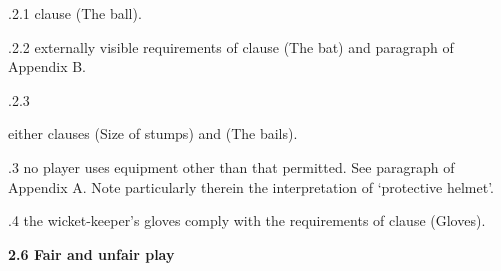 \documentclass[12pt]{article}
\begin{document}
\vspace{\baselineskip}
\begin{adjustwidth}{0.49in}{0.0in}
{\fontsize{9pt}{10.8pt}.2.1 \tabto{1.17in} clause (The ball).\par}\par

\end{adjustwidth}


\vspace{\baselineskip}
\begin{adjustwidth}{0.49in}{0.0in}
{\fontsize{9pt}{10.8pt}.2.2 \tabto{1.17in} externally visible requirements of clause (The bat) and paragraph of Appendix B.\par}\par

\end{adjustwidth}


\vspace{\baselineskip}
\begin{adjustwidth}{0.49in}{0.0in}
{\fontsize{9pt}{10.8pt}.2.3 \tabto{1.17in} {\fontsize{8pt}{9.6pt}\selectfont either clauses (Size of stumps) and (The bails).\par}\par}\par

\end{adjustwidth}


\vspace{\baselineskip}
\begin{adjustwidth}{0.5in}{0.39in}
{\fontsize{9pt}{10.8pt}.3 \tabto{0.49in} no player uses equipment other than that permitted. See paragraph of Appendix A. Note particularly therein the interpretation of ‘protective helmet’.\par}\par

\end{adjustwidth}


\vspace{\baselineskip}
{\fontsize{9pt}{10.8pt}.4 \tabto{0.49in} the wicket-keeper’s gloves comply with the requirements of clause (Gloves).\par}\par


\vspace{\baselineskip}
{\fontsize{11pt}{13.2pt}\selectfont \textbf{2.6 \tabto{0.47in} Fair and unfair play}\par}\par
\end{document}
